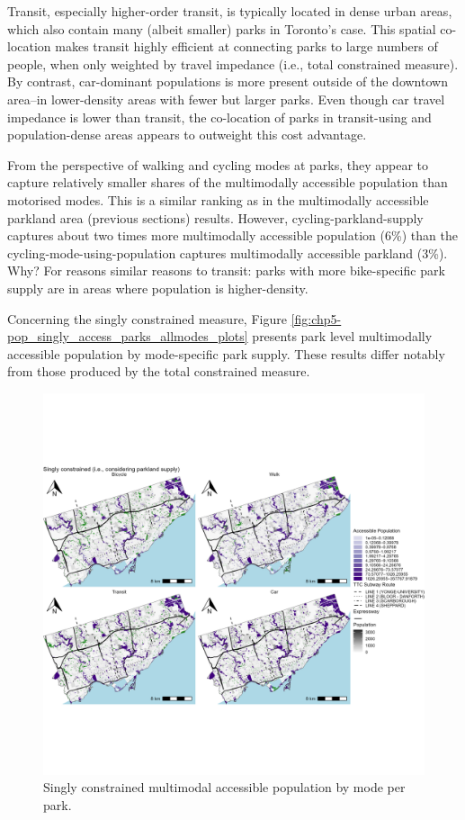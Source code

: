 \documentclass[
11pt, %
oneside, %
english, %
singlespacing, %
]{macthesis} %
\begin{document}
Transit, especially higher-order transit, is typically located in dense urban areas, which also contain many (albeit smaller) parks in Toronto's case. This spatial co-location makes transit highly efficient at connecting parks to large numbers of people, when only weighted by travel impedance (i.e., total constrained measure). By contrast, car-dominant populations is more present outside of the downtown area--in lower-density areas with fewer but larger parks. Even though car travel impedance is lower than transit, the co-location of parks in transit-using and population-dense areas appears to outweight this cost advantage.

From the perspective of walking and cycling modes at parks, they appear to capture relatively smaller shares of the multimodally accessible population than motorised modes. This is a similar ranking as in the multimodally accessible parkland area (previous sections) results. However, cycling-parkland-supply captures about two times more multimodally accessible population (6\%) than the cycling-mode-using-population captures multimodally accessible parkland (3\%). Why? For reasons similar reasons to transit: parks with more bike-specific park supply are in areas where population is higher-density.

Concerning the singly constrained measure, Figure \ref{fig:chp5-pop_singly_access_parks_allmodes_plots} presents park level multimodally accessible population by mode-specific park supply. These results differ notably from those produced by the total constrained measure.

\begin{figure}

{\centering \includegraphics[width=6in]{./data/figures/chp5-pop_singly_access_parks_allmodes_plots} 

}

\caption{\label{fig:chp5-pop_singly_access_parks_allmodes_plots} Singly constrained multimodal accessible population by mode per park.}\label{fig:unnamed-chunk-88}
\end{figure}
\end{document}
